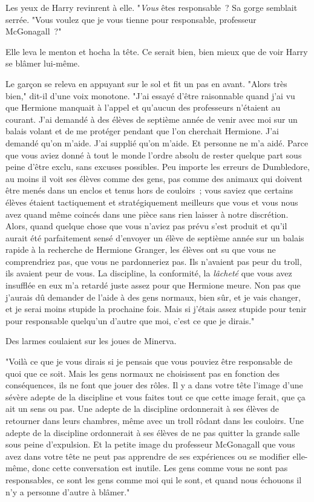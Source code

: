 Les yeux de Harry revinrent à elle. "\emph{Vous} êtes responsable~? Sa gorge semblait serrée. "Vous voulez que je vous tienne pour responsable, professeur McGonagall~?"

Elle leva le menton et hocha la tête. Ce serait bien, bien mieux que de voir Harry se blâmer lui-même.

Le garçon se releva en appuyant sur le sol et fit un pas en avant. "Alors très bien," dit-il d'une voix monotone. "J'ai essayé d'être raisonnable quand j'ai vu que Hermione manquait à l'appel et qu'aucun des professeurs n'étaient au courant. J'ai demandé à des élèves de septième année de venir avec moi sur un balais volant et de me protéger pendant que l'on cherchait Hermione. J'ai demandé qu'on m'aide. J'ai supplié qu'on m'aide. Et personne ne m'a aidé. Parce que vous aviez donné à tout le monde l'ordre absolu de rester quelque part sous peine d'être exclu, sans excuses possibles. Peu importe les erreurs de Dumbledore, au moins il voit ses élèves comme des gens, pas comme des animaux qui doivent être menés dans un enclos et tenus hors de couloirs~; vous saviez que certains élèves étaient tactiquement et stratégiquement meilleurs que vous et vous nous avez quand même coincés dans une pièce sans rien laisser à notre discrétion. Alors, quand quelque chose que vous n'aviez pas prévu s'est produit et qu'il aurait été parfaitement sensé d'envoyer un élève de septième année sur un balais rapide à la recherche de Hermione Granger, les élèves ont su que vous ne comprendriez pas, que vous ne pardonneriez pas. Ils n'avaient pas peur du troll, ils avaient peur de vous. La discipline, la conformité, la \emph{lâcheté} que vous avez insufflée en eux m'a retardé juste assez pour que Hermione meure. Non pas que j'aurais dû demander de l'aide à des gens normaux, bien sûr, et je vais changer, et je serai moins stupide la prochaine fois. Mais si j'étais assez stupide pour tenir pour responsable quelqu'un d'autre que moi, c'est ce que je dirais."

Des larmes coulaient sur les joues de Minerva.

"Voilà ce que je vous dirais si je pensais que vous pouviez être responsable de quoi que ce soit. Mais les gens normaux ne choisissent pas en fonction des conséquences, ils ne font que jouer des rôles. Il y a dans votre tête l'image d'une sévère adepte de la discipline et vous faites tout ce que cette image ferait, que ça ait un sens ou pas. Une adepte de la discipline ordonnerait à ses élèves de retourner dans leurs chambres, même avec un troll rôdant dans les couloirs. Une adepte de la discipline ordonnerait à ses élèves de ne pas quitter la grande salle sous peine d'expulsion. Et la petite image du professeur McGonagall que vous avez dans votre tête ne peut pas apprendre de ses expériences ou se modifier elle-même, donc cette conversation est inutile. Les gens comme vous ne sont pas responsables, ce sont les gens comme moi qui le sont, et quand nous échouons il n'y a personne d'autre à blâmer."

